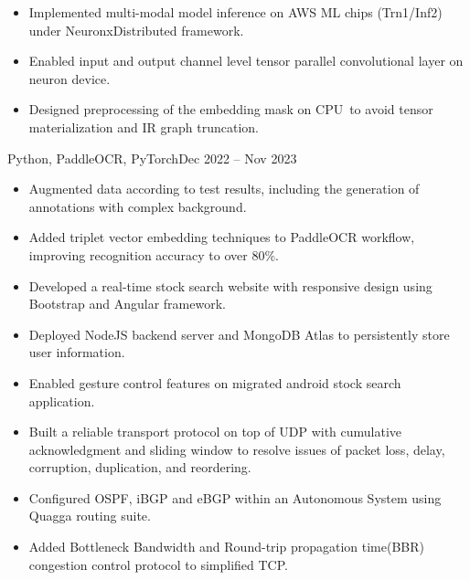 \documentclass[10pt,a4paper]{altacv}
\begin{document}
\begin{itemize}
	\item Implemented multi-modal model inference on AWS  ML chips (Trn1/Inf2) under NeuronxDistributed framework.
	\item Enabled input and output channel level tensor parallel convolutional layer on neuron device.
	\item Designed preprocessing of the embedding mask on CPU\ to avoid tensor materialization and IR graph truncation.
\end{itemize}

 {Python, PaddleOCR, PyTorch}{Dec 2022 -- Nov 2023}
\begin{itemize}
	\item Augmented data according to test results, including the generation of annotations with complex background.
	\item Added triplet vector embedding techniques to PaddleOCR workflow, improving recognition accuracy to over 80\%.
\end{itemize}



\begin{itemize}
	\item Developed a real-time stock search website with responsive design using Bootstrap and Angular framework. \href{http://stock-env.eba-etbgm9hj.us-west-1.elasticbeanstalk.com/search/home}{\faExternalLink}
	\item Deployed NodeJS backend server and MongoDB Atlas to persistently store user information.
	\item Enabled gesture control features on migrated android stock search application.
\end{itemize}

\begin{itemize}
	\item Built a reliable transport protocol on top of UDP with cumulative acknowledgment and sliding window to resolve issues of packet loss, delay, corruption, duplication, and reordering.
	\item Configured OSPF, iBGP and eBGP within an Autonomous System using Quagga routing suite.
	\item Added Bottleneck Bandwidth and Round-trip propagation time(BBR) congestion control protocol to simplified TCP.
\end{itemize}
\end{document}
